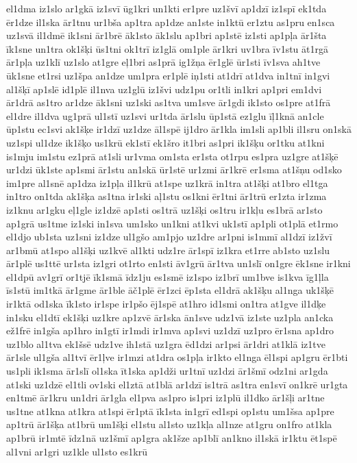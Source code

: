 {el1dma
iz1slo
ar1gkā
iz1svī
ūg1kri
un1kti
er1pre
uz1švī
ap1dzī
iz1spī
ek1tda
ēr1dze
il1ska
ār1tnu
ur1bša
ap1tra
ap1dze
an1ste
in1ktū
er1ztu
as1pru
en1sca
uz1svā
il1dmē
ik1sni
ār1brē
āk1sto
āk1slu
ap1bri
ap1stē
iz1sti
ap1pļa
ār1šta
īk1sne
un1tra
ok1šķi
ūs1tni
ok1trī
iz1glā
om1ple
ār1kri
uv1bra
īv1stu
āt1rgā
ār1pļa
uz1klī
uz1slo
at1gre
eļ1bri
as1prā
ig1žņa
ēr1glē
ūr1sti
īv1sva
ah1tve
ūk1sne
et1rsi
uz1špa
an1dze
um1pra
er1plē
iņ1sti
at1drī
at1dva
in1tnī
in1gvi
al1šķī
ap1slē
id1plē
il1nva
uz1glū
iz1švi
udz1pu
or1tli
in1kri
ap1pri
em1dvi
ār1drā
as1tro
ar1dze
āk1sni
uz1ski
as1tva
um1sve
ār1gdi
ik1sto
os1pre
at1frā
el1dre
il1dva
ug1prā
ul1stī
uz1svi
ur1tda
ār1slu
ūp1stā
ez1glu
īļ1knā
an1cle
ūp1stu
ec1svi
ak1šķe
ir1dzī
uz1dze
āl1spē
ij1dro
ār1kla
im1sli
ap1bli
il1sru
on1skā
uz1spi
ul1dze
ik1šķo
us1krū
ek1stī
ek1šro
it1bri
as1pri
ik1šķu
or1tku
at1kni
is1mju
im1stu
ez1prā
at1sli
ur1vma
om1sta
er1sta
ot1rpu
es1pra
uz1gre
at1šķē
ur1dzi
ūk1ste
ap1smi
ār1stu
an1skā
ūr1stē
ur1zmi
ār1krē
er1sma
at1šņu
od1sko
im1pre
al1snē
ap1dza
iz1pļa
il1krū
at1spe
uz1krā
in1tra
at1šķi
at1bro
el1tga
in1tro
on1tda
ak1šķa
as1tna
ir1ski
aļ1stu
os1kni
ēr1tni
ār1trū
er1zta
ir1zma
iz1knu
ar1gku
eļ1gle
iz1dzē
ap1sti
os1trā
uz1šķi
os1tru
ir1kļu
es1brā
ar1sto
ap1grā
us1tme
iz1ski
in1sva
um1sko
un1kni
at1kvi
uk1stī
ap1pli
ot1plā
et1rmo
el1djo
ub1sta
uz1sni
iz1dze
ul1gšo
am1pjo
uz1dre
ar1pni
is1mmī
al1dzī
iz1žvī
ar1bmū
at1spo
al1šķi
uz1kvē
al1kti
udz1re
ār1spī
iz1kra
et1rre
ab1sto
uz1slu
ār1plē
us1ttē
ur1sta
iz1gri
ot1rto
en1sti
āv1grū
ār1tva
un1slī
on1gre
ēk1sne
ir1kni
el1dpū
av1grī
or1tjē
īk1smā
īdz1ju
es1smē
iz1spo
iz1brī
um1bve
is1kva
īg1ļla
īs1stū
im1tkā
ār1gme
ār1ble
āč1plē
ēr1zci
ēp1sta
el1drā
ak1šķu
al1nga
uk1šķē
ir1ktā
od1ska
īk1sto
ir1spe
ir1pšo
ēj1spē
at1hro
id1smi
on1tra
at1gve
il1dķe
in1sku
el1dtī
ek1šķi
uz1kre
ap1zvē
ār1ska
ān1sve
udz1vā
iz1ste
uz1pla
an1cka
ež1frē
in1gša
ap1hro
in1gtī
ir1mdi
ir1mva
ap1svi
uz1dzī
uz1pro
ēr1sna
ap1dro
uz1blo
al1tva
ek1šsē
udz1ve
ih1stā
uz1gra
ēd1dzi
ar1psi
ār1dri
at1klā
iz1tve
ār1sle
ul1gša
al1tvī
ēr1ļve
ir1mzi
at1dra
os1pļa
ir1kto
el1nga
ēl1spi
ap1gru
ēr1bti
us1pli
ik1sma
ār1slī
ol1ska
īt1ska
ap1dži
ur1tnī
uz1dzi
ār1šmī
odz1ni
ar1gda
at1ski
uz1dzē
el1tli
ov1ski
el1ztā
at1blā
ar1dzī
is1trā
as1tra
en1svī
on1krē
ur1gta
en1tmē
ār1kru
un1dri
ār1gla
el1pva
as1pro
is1pri
iz1plū
il1dko
ār1šļi
ar1tne
us1tne
at1kna
at1kra
at1spi
ēr1ptā
īk1sta
in1grī
ed1spi
op1stu
um1šsa
ap1pre
ap1trū
ār1šķa
at1brū
um1šķi
el1stu
al1sto
uz1kļa
al1nze
at1gru
on1fro
at1kla
ap1brū
ir1mtē
īdz1nā
uz1šmī
ap1gra
ak1šze
ap1blī
an1kno
il1skā
ir1ktu
ēt1spē
al1vni
ar1gri
uz1kle
ul1sto
es1krū
}

